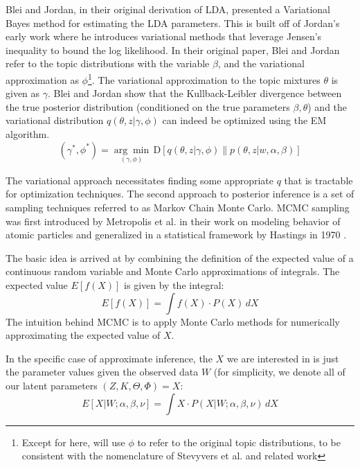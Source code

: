 Blei and Jordan, in their original derivation of LDA\cite{blei2003latent}, presented a Variational Bayes method for estimating the LDA parameters.  This is built off of Jordan's early work where he introduces variational methods that leverage Jensen’s inequality to bound the log likelihood\cite{jordan1999}.  In their original paper, Blei and Jordan refer to the topic distributions with the variable $\beta$, and the variational approximation as $\phi$\footnote{Except for here, will use $\phi$ to refer to the original topic distributions, to be consistent with the nomenclature of Stevyvers et al.\cite{steyvers2007} and related work}.  The variational approximation to the topic mixtures $\theta$ is given as $\gamma$.  Blei and Jordan show that the Kullback-Leibler divergence between the true posterior distribution (conditioned on the true parameters $\beta,\theta$) and the variational distribution $q(\theta,z|\gamma,\phi)$ can indeed be optimized using the EM algorithm.  
\begin{equation}
(\gamma^*, \phi^*) = \underset{(\gamma,\phi)}{\arg \min}\,\text{D}\left[q(\theta,z|\gamma,\phi)\|p(\theta,z|w,\alpha,\beta)\right]
\end{equation}

\nocite{hoffman2010online} 

The variational approach necessitates finding some appropriate $q$ that is tractable for optimization techniques.  The second approach to posterior inference is a set of sampling techniques referred to as Markov Chain Monte Carlo.  MCMC sampling was first introduced by Metropolis et al.\cite{metropolis1953equation} in their work on modeling behavior of atomic particles and generalized in a statistical framework by Hastings in 1970 \cite{hastings1970monte}.

The basic idea is arrived at by combining the definition of the expected value of a continuous random variable and Monte Carlo approximations of integrals.  The expected value $E[f(X)]$ is given by the integral:
\begin{equation}
E\left[f(X)\right] =\int{f(X)\cdot P(X)\,dX} \label{eqn5:expectedValue}
\end{equation}
\noindent The intuition behind MCMC is to apply Monte Carlo methods for numerically approximating the expected value of $X$.

In the specific case of approximate inference, the $X$ we are interested in is just the parameter values given the observed data $W$ (for simplicity, we denote all of our latent parameters $(Z,K,\Theta,\Phi) = X$:
\begin{equation}
E\left[X|W;\alpha,\beta,\nu\right] =\int{X\cdot P(X|W;\alpha,\beta,\nu)\,dX} \label{eqn5:integral}
\end{equation}

